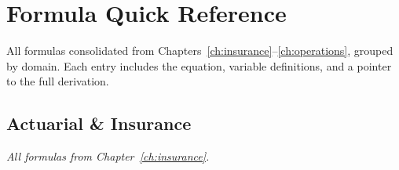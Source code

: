 
\chapter{Formula Quick Reference}
\label{app:formulas}

All formulas consolidated from Chapters~\ref{ch:insurance}--\ref{ch:operations}, grouped by domain. Each entry includes the equation, variable definitions, and a pointer to the full derivation.

\section{Actuarial \& Insurance}

\noindent\textit{All formulas from Chapter~\ref{ch:insurance}.}

\medskip

